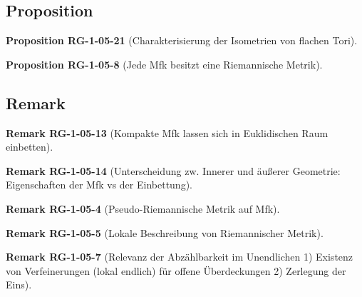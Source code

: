 \documentclass[10pt, letterpaper]{article}
\newcommand{\CustomHeading}[3]{%
  \par\medskip\noindent%
  \textbf{#1 #2} \textnormal{(#3)}.\enskip%
}
\newenvironment{PROP}[2]{\CustomHeading{Proposition}{#1}{#2}}{}
\newenvironment{REM}[2]{\CustomHeading{Remark}{#1}{#2}}{}
\begin{document}
\subsection{Proposition}



\begin{PROP}{RG-1-05-21}{Charakterisierung der Isometrien von flachen Tori}

\end{PROP}

\begin{PROP}{RG-1-05-8}{Jede Mfk besitzt eine Riemannische Metrik}

\end{PROP}



\subsection{Remark}



\begin{REM}{RG-1-05-13}{Kompakte Mfk lassen sich in Euklidischen Raum einbetten}

\end{REM}

\begin{REM}{RG-1-05-14}{Unterscheidung zw. Innerer und äußerer Geometrie: Eigenschaften der Mfk vs der Einbettung}

\end{REM}

\begin{REM}{RG-1-05-4}{Pseudo-Riemannische Metrik auf Mfk}

\end{REM}

\begin{REM}{RG-1-05-5}{Lokale Beschreibung von Riemannischer Metrik}

\end{REM}

\begin{REM}{RG-1-05-7}{Relevanz der Abzählbarkeit im Unendlichen
1) Existenz von Verfeinerungen (lokal endlich) für offene Überdeckungen
2) Zerlegung der Eins}

\end{REM}
\end{document}
